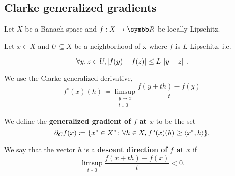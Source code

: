 \subsection{Clarke generalized gradients}\label{subsec:clarke_gradients}

Let \( X \) be a Banach space and \( f: X \to \BB{R} \) be locally Lipschitz.

\begin{definition}\label{def:clarke_gradient}\cite[definition 10.3]{Clarke2013}
  Let \( x \in X \) and \( U \subseteq X \) be a neighborhood of x where \( f \) is \( L \)-Lipschitz, i.e.

  \begin{equation*}
    \forall y, z \in U, \left\vert f(y) - f(z) \right\vert \leq L \left\Vert y - z \right\Vert.
  \end{equation*}

  We use the Clarke generalized derivative,
  \begin{equation*}
    f^\circ(x)(h) \coloneqq \limsup_{\substack{y \to x \\ t \downarrow 0}} \frac {f(y + th) - f(y)} t
  \end{equation*}

  We define the \textbf{generalized gradient of \( f \) at \( x \)} to be the set
  \begin{equation*}
    \partial_C f(x) \coloneqq \{ x^* \in X^* \colon \forall h \in X, f^\circ(x)(h) \geq \left\langle x^*, h \right\rangle \}.
  \end{equation*}

  We say that the vector \( h \) is a \textbf{descent direction of \( f \) at \( x \)} if
  \begin{equation*}
    \limsup_{t \downarrow 0} \frac {f(x + th) - f(x)} t < 0.
  \end{equation*}
\end{definition}

